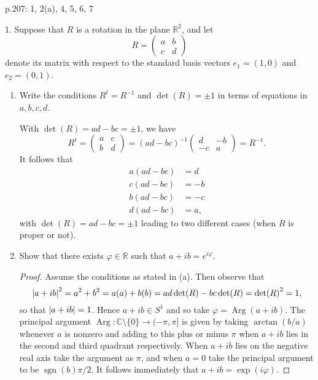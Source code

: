 \documentclass[11pt]{article}
\DeclareMathOperator\Arg{Arg}
\DeclareMathOperator\sgn{sgn}
\begin{document}
p.207: 1, 2(a), 4, 5, 6, 7

1. Suppose that $R$ is a rotation in the plane $\mathbb{R}^2$, and let \[R = \begin{pmatrix}
  a & b \\ c & d
\end{pmatrix}\] denote its matrix with respect to the standard basis vectors $e_1 = (1,0)$ and $e_2 = (0,1)$.\begin{enumerate}[label=(\alph*)]
  \item Write the conditions $R^t = R^{-1}$ and $\det(R) = \pm 1$ in terms of equations in $a,b,c,d$.
  
  With $\det(R) = ad-bc = \pm 1$, we have \[R^t = \begin{pmatrix}
    a & c \\ b & d
  \end{pmatrix} = (ad-bc)^{-1}\begin{pmatrix}
    d & -b \\ -c & a
  \end{pmatrix} = R^{-1}.\] It follows that \begin{align*}
    a(ad-bc) &= d\\
    c(ad-bc) &= -b\\
    b(ad-bc) &= -c\\
    d(ad-bc) &= a,
  \end{align*} with $\det(R) = ad-bc = \pm 1$ leading to two different cases (when $R$ is proper or not).
  \item Show that there exists $\varphi\in\mathbb{R}$ such that $a+ib = e^{i\varphi}$.
  \begin{proof} Assume the conditions as stated in (a). Then observe that \[\abs{a+ib}^2 = a^2+b^2 = a(a) + b(b) = ad\det(R) - bc\det(R) = \det(R)^2 = 1,\] so that $\abs{a+ib} = 1$. Hence $a+ib\in S^1$ and so take $\varphi = \Arg(a+ib)$. The principal argument $\Arg\colon\mathbb{C}\setminus \{0\}\to (-\pi,\pi]$ is given by taking $\arctan(b/a)$ whenever $a$ is nonzero and adding to this plus or minus $\pi$ when $a+ib$ lies in the second and third quadrant respectively. When $a+ib$ lies on the negative real axis take the argument as $\pi$, and when $a=0$ take the principal argument to be $\sgn(b)\pi/2$. It follows immediately that $a+ib = \exp(i\varphi)$.


\end{proof}
\end{enumerate}
\end{document}
